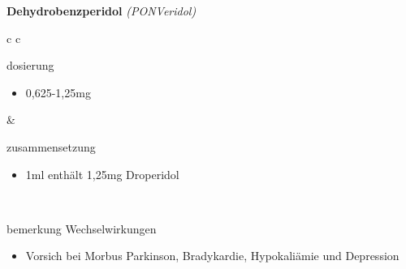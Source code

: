 \begin{frame}{
    \textbf{Dehydrobenzperidol}
    \textit{(PONVeridol)}
}
    \begin{tabular}{c c}
        \begin{beamercolorbox}[wd=\boxwidth\textwidth,ht=\boxheight\textheight,sep=1em]{dosierung}
            \begin{itemize}
                \item 0,625-1,25mg
            \end{itemize}
        \end{beamercolorbox} & 
        \begin{beamercolorbox}[wd=\boxwidth\textwidth,ht=\boxheight\textheight,sep=1em]{zusammensetzung}
            \begin{itemize}
                \item 1ml enthält 1,25mg Droperidol
            \end{itemize}
        \end{beamercolorbox} \\
        \begin{beamercolorbox}[wd=\textwidth,ht=\boxheight\textheight,sep=1em]{bemerkung}
            Wechselwirkungen
            \begin{itemize}
                \item Vorsich bei Morbus Parkinson, Bradykardie, Hypokaliämie und Depression
            \end{itemize}
        \end{beamercolorbox} \\
    \end{tabular}
\end{frame}